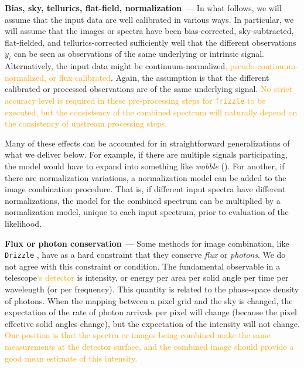 \documentclass[modern, linenumbers]{aastex631}
\renewcommand{\paragraph}[1]{\medskip\par\noindent\textbf{#1}~---}
\newcommand{\modified}[1]{\textcolor{orange}{#1}}
\begin{document}
\paragraph{Bias, sky, tellurics, flat-field, normalization}
In what follows, we will assume that the input data are well calibrated in various ways.
In particular, we will assume that the images or spectra have been bias-corrected, sky-subtracted, flat-fielded, and tellurics-corrected sufficiently well that the different observations $y_i$ can be seen as observations of the same underlying or intrinsic signal.
Alternatively, the input data might be continuum-normalized\modified{, pseudo-continuum-normalized, or flux-calibrated}.
Again, the assumption is that the different calibrated or processed observations are of the same underlying signal. \modified{No strict accuracy level is required in these pre-processing steps for \texttt{frizzle} to be executed, but the consistency of the combined spectrum will naturally depend on the consistency of upstream processing steps.}

Many of these effects can be accounted for in straightforward generalizations of what we deliver below.
For example, if there are multiple signals participating, the model would have to expand into something like \textsl{wobble} (\citealt{wobble}).
For another, if there are normalization variations, a normalization model can be added to the image combination procedure.
That is, if different input spectra have different normalizations, the model for the combined spectrum can be multiplied by a normalization model, unique to each input spectrum, prior to evaluation of the likelihood.

\paragraph{Flux or photon conservation}
Some methods for image combination, like \texttt{Drizzle} \citep{drizzle}, have as a hard constraint that they conserve \emph{flux} or \emph{photons}.
We do not agree with this constraint or condition.
The fundamental observable in a telescope\modified{'s detector} is intensity, or energy per area per solid angle per time per wavelength (or per frequency).
This quantity is related to the phase-space density of photons.
When the mapping between a pixel grid and the sky is changed, the expectation of the rate of photon arrivals per pixel will change (because the pixel effective solid angles change), but the expectation of the intensity will not change.
\modified{Our position is that the spectra or images being combined make the same measurements at the detector surface, and the combined image should provide a good mean estimate of this intensity.}
\end{document}

